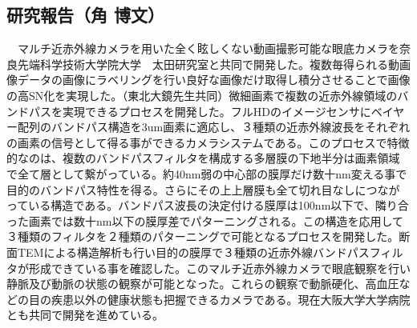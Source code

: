 \subsection{研究報告（角 博文）}

　マルチ近赤外線カメラを用いた全く眩しくない動画撮影可能な眼底カメラを奈良先端科学技術大学院大学　太田研究室と共同で開発した。複数毎得られる動画像データの画像にラベリングを行い良好な画像だけ取得し積分させることで画像の高SN化を実現した。（東北大鏡先生共同）微細画素で複数の近赤外線領域のバンドパスを実現できるプロセスを開発した。フルHDのイメージセンサにベイヤー配列のバンドパス構造を3um画素に適応し、３種類の近赤外線波長をそれぞれの画素の信号として得る事ができるカメラシステムである。このプロセスで特徴的なのは、複数のバンドパスフィルタを構成する多層膜の下地半分は画素領域で全て層として繋がっている。約40nm弱の中心部の膜厚だけ数十nm変える事で目的のバンドパス特性を得る。さらにその上上層膜も全て切れ目なしにつながっている構造である。バンドパス波長の決定付ける膜厚は100nm以下で、隣り合った画素では数十nm以下の膜厚差でパターニングされる。この構造を応用して３種類のフィルタを２種類のパターニングで可能となるプロセスを開発した。断面TEMによる構造解析も行い目的の膜厚で３種類の近赤外線バンドパスフィルタが形成できている事を確認した。このマルチ近赤外線カメラで眼底観察を行い静脈及び動脈の状態の観察が可能となった。これらの観察で動脈硬化、高血圧などの目の疾患以外の健康状態も把握できるカメラである。現在大阪大学大学病院とも共同で開発を進めている。

